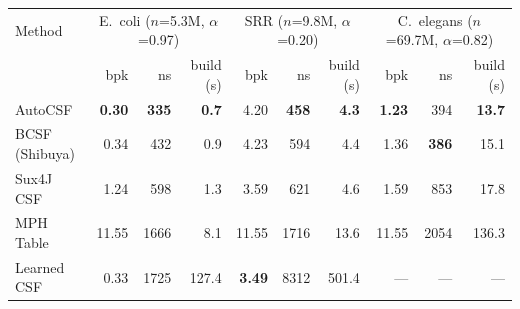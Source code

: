 \begin{tabular}{lrrrrrrrrr}
\toprule
Method & \multicolumn{3}{c}{E.\ coli ($n$=5.3M, $\alpha$=0.97)} & \multicolumn{3}{c}{SRR ($n$=9.8M, $\alpha$=0.20)} & \multicolumn{3}{c}{C.\ elegans ($n$=69.7M, $\alpha$=0.82)} \\
 & bpk & ns & build (s) & bpk & ns & build (s) & bpk & ns & build (s) \\
\midrule
AutoCSF & \textbf{0.30} & \textbf{335} & \textbf{0.7} & 4.20 & \textbf{458} & \textbf{4.3} & \textbf{1.23} & 394 & \textbf{13.7} \\
BCSF (Shibuya) & 0.34 & 432 & 0.9 & 4.23 & 594 & 4.4 & 1.36 & \textbf{386} & 15.1 \\
Sux4J CSF & 1.24 & 598 & 1.3 & 3.59 & 621 & 4.6 & 1.59 & 853 & 17.8 \\
MPH Table & 11.55 & 1666 & 8.1 & 11.55 & 1716 & 13.6 & 11.55 & 2054 & 136.3 \\
Learned CSF & 0.33 & 1725 & 127.4 & \textbf{3.49} & 8312 & 501.4 & --- & --- & --- \\
\bottomrule
\end{tabular}